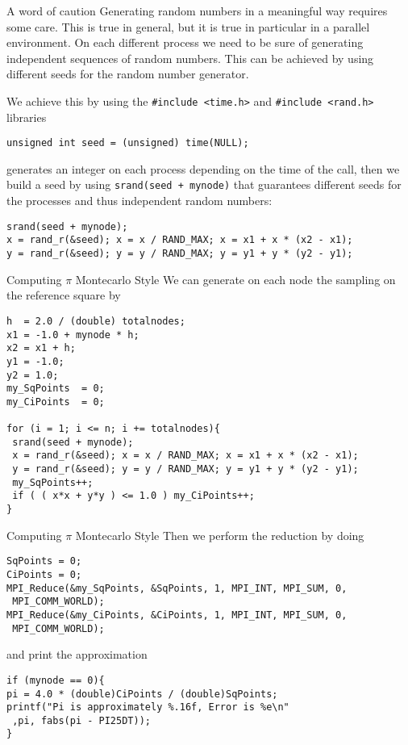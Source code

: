 \documentclass[xcolor={svgnames,usenames}]{beamer}
\begin{document}
\begin{frame}[fragile]{A word of caution}
Generating random numbers in a meaningful way requires some care. This is true in general, but it is true in particular in a parallel environment. On each different process we need to be sure of generating \alert{independent sequences of random numbers}. This can be achieved by using different seeds for the random number generator.

We achieve this by using the \texttt{#include <time.h>} and \texttt{#include <rand.h>} libraries
\begin{verbatim}
unsigned int seed = (unsigned) time(NULL);
\end{verbatim}
generates an integer on each process depending on the time of the call, then we build a seed by using \texttt{srand(seed + mynode)} that guarantees different seeds for the processes and thus independent random numbers:
\begin{verbatim}
srand(seed + mynode);
x = rand_r(&seed); x = x / RAND_MAX; x = x1 + x * (x2 - x1);
y = rand_r(&seed); y = y / RAND_MAX; y = y1 + y * (y2 - y1);
\end{verbatim}
\end{frame}

\begin{frame}[fragile]{Computing $\pi$ Montecarlo Style}
We can generate on each node the sampling on the reference square by
\begin{verbatim}
h  = 2.0 / (double) totalnodes;
x1 = -1.0 + mynode * h;
x2 = x1 + h;
y1 = -1.0;
y2 = 1.0;
my_SqPoints  = 0;
my_CiPoints  = 0;

for (i = 1; i <= n; i += totalnodes){
 srand(seed + mynode);
 x = rand_r(&seed); x = x / RAND_MAX; x = x1 + x * (x2 - x1);
 y = rand_r(&seed); y = y / RAND_MAX; y = y1 + y * (y2 - y1);
 my_SqPoints++;
 if ( ( x*x + y*y ) <= 1.0 ) my_CiPoints++;
}
\end{verbatim}
\end{frame}

\begin{frame}[fragile]{Computing $\pi$ Montecarlo Style}
\small
Then we perform the reduction by doing
\begin{verbatim}
SqPoints = 0;
CiPoints = 0;
MPI_Reduce(&my_SqPoints, &SqPoints, 1, MPI_INT, MPI_SUM, 0,
 MPI_COMM_WORLD);
MPI_Reduce(&my_CiPoints, &CiPoints, 1, MPI_INT, MPI_SUM, 0,
 MPI_COMM_WORLD);
\end{verbatim}
and print the approximation
\begin{verbatim}
if (mynode == 0){
pi = 4.0 * (double)CiPoints / (double)SqPoints;
printf("Pi is approximately %.16f, Error is %e\n"
 ,pi, fabs(pi - PI25DT));
}
\end{verbatim}
\end{frame}
\end{document}

